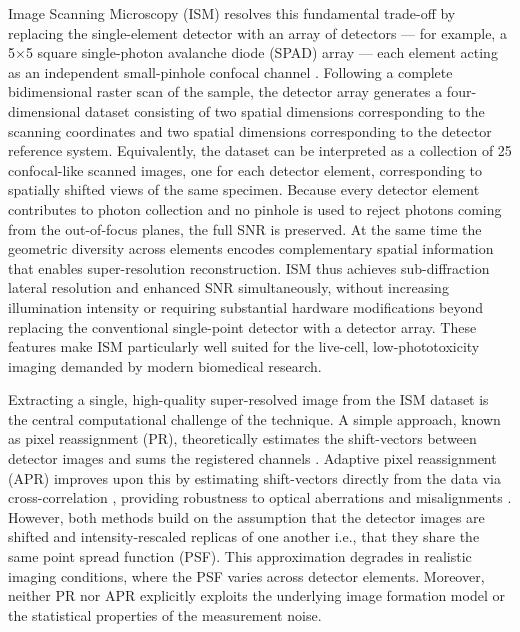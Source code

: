 \documentclass[letterpaper]{article}
\begin{document}
Image Scanning Microscopy (ISM) \cite{bertero1982resolution,Sheppard1988Super-resolutionImaging,muller2010image} resolves this fundamental trade-off by replacing the single-element detector with an array of detectors — for example, a 5$\times$5 square single-photon avalanche diode (SPAD) array — each element acting as an independent small-pinhole confocal channel \cite{castello2019robust}. Following a complete bidimensional raster scan of the sample, the detector array generates a four-dimensional dataset consisting of two spatial dimensions corresponding to the scanning coordinates and two spatial dimensions corresponding to the detector reference system. Equivalently, the dataset can be interpreted as a collection of 25 confocal-like scanned images, one for each detector element, corresponding to spatially shifted views of the same specimen. Because every detector element contributes to photon collection and no pinhole is used to reject photons coming from the out-of-focus planes, the full SNR is preserved. At the same time the geometric diversity across elements encodes complementary spatial information that enables super-resolution reconstruction. ISM thus achieves sub-diffraction lateral resolution and enhanced SNR simultaneously, without increasing illumination intensity or requiring substantial hardware modifications beyond replacing the conventional single-point detector with a detector array. These features make ISM particularly well suited for the live-cell, low-phototoxicity imaging demanded by modern biomedical research.

Extracting a single, high-quality super-resolved image from the ISM dataset is the central computational challenge of the technique. A simple approach, known as pixel reassignment (PR), theoretically estimates the shift-vectors between detector images and sums the registered channels \cite{
sheppard2013superresolution}. Adaptive pixel reassignment (APR) improves upon this by estimating shift-vectors directly from the data via cross-correlation \cite{castello2019robust}, providing robustness to optical aberrations and misalignments \cite{sheppard2019pixel, fersini2025wavefront}. However, both methods build on the assumption that the detector images are shifted and intensity-rescaled replicas of one another i.e., that they share the same point spread function (PSF). This approximation degrades in realistic imaging conditions, where the PSF varies across detector elements. Moreover, neither PR nor APR explicitly exploits the underlying image formation model or the statistical properties of the measurement noise.
\end{document}
